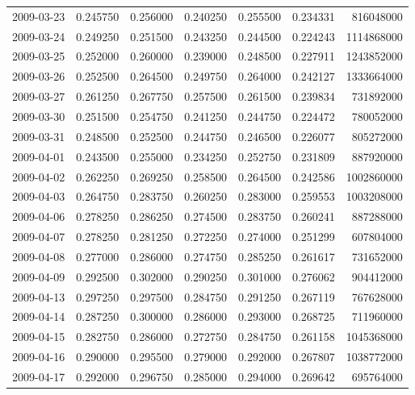 \begin{tabular}{lrrrrrr}
2009-03-23 &    0.245750 &    0.256000 &    0.240250 &    0.255500 &    0.234331 &   816048000 \\
2009-03-24 &    0.249250 &    0.251500 &    0.243250 &    0.244500 &    0.224243 &  1114868000 \\
2009-03-25 &    0.252000 &    0.260000 &    0.239000 &    0.248500 &    0.227911 &  1243852000 \\
2009-03-26 &    0.252500 &    0.264500 &    0.249750 &    0.264000 &    0.242127 &  1333664000 \\
2009-03-27 &    0.261250 &    0.267750 &    0.257500 &    0.261500 &    0.239834 &   731892000 \\
2009-03-30 &    0.251500 &    0.254750 &    0.241250 &    0.244750 &    0.224472 &   780052000 \\
2009-03-31 &    0.248500 &    0.252500 &    0.244750 &    0.246500 &    0.226077 &   805272000 \\
2009-04-01 &    0.243500 &    0.255000 &    0.234250 &    0.252750 &    0.231809 &   887920000 \\
2009-04-02 &    0.262250 &    0.269250 &    0.258500 &    0.264500 &    0.242586 &  1002860000 \\
2009-04-03 &    0.264750 &    0.283750 &    0.260250 &    0.283000 &    0.259553 &  1003208000 \\
2009-04-06 &    0.278250 &    0.286250 &    0.274500 &    0.283750 &    0.260241 &   887288000 \\
2009-04-07 &    0.278250 &    0.281250 &    0.272250 &    0.274000 &    0.251299 &   607804000 \\
2009-04-08 &    0.277000 &    0.286000 &    0.274750 &    0.285250 &    0.261617 &   731652000 \\
2009-04-09 &    0.292500 &    0.302000 &    0.290250 &    0.301000 &    0.276062 &   904412000 \\
2009-04-13 &    0.297250 &    0.297500 &    0.284750 &    0.291250 &    0.267119 &   767628000 \\
2009-04-14 &    0.287250 &    0.300000 &    0.286000 &    0.293000 &    0.268725 &   711960000 \\
2009-04-15 &    0.282750 &    0.286000 &    0.272750 &    0.284750 &    0.261158 &  1045368000 \\
2009-04-16 &    0.290000 &    0.295500 &    0.279000 &    0.292000 &    0.267807 &  1038772000 \\
2009-04-17 &    0.292000 &    0.296750 &    0.285000 &    0.294000 &    0.269642 &   695764000 \\

\end{tabular}
